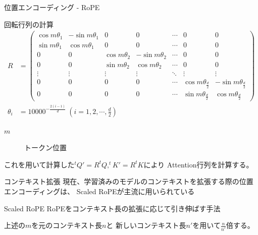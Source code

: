 \documentclass[dvipdfm]{beamer}
\begin{document}
    \begin{frame}{位置エンコーディング - RoPE}
        \begin{block}{回転行列の計算}
            {\small
                \begin{align*}
                    R &= \begin{pmatrix}
                        \cos m\theta_1 & -\sin m\theta_1 & 0 & 0 & \cdots & 0 & 0 \\
                        \sin m\theta_1 & \cos m\theta_1 & 0 & 0 & \cdots & 0 & 0 \\
                        0 & 0 & \cos m\theta_2 & -\sin m\theta_2 & \cdots & 0 & 0 \\
                        0 & 0 & \sin m\theta_2 & \cos m\theta_2 & \cdots & 0 & 0 \\
                        \vdots & \vdots & \vdots & \vdots & \ddots & \vdots & \vdots \\
                        0 & 0 & 0 & 0 & \cdots & \cos m\theta_\frac{d}{2} & -\sin m\theta_\frac{d}{2} \\
                        0 & 0 & 0 & 0 & \cdots & \sin m\theta_\frac{d}{2} & \cos m\theta_\frac{d}{2}
                    \end{pmatrix} \\
                    \theta_i &= 10000^{-\frac{2(i-1)}{d}} \ \left(i = 1, 2, \cdots, \frac{d}{2}\right)
                \end{align*}
            }

            \begin{description}
                \item[$m$] トークン位置
            \end{description}
        \end{block}
        これを用いて計算した$^t\!Q' = R^t\!Q, ^t\!K' = R^t\!K$により
        Attention行列を計算する。
    \end{frame}
    \begin{frame}{コンテキスト拡張}
        現在、学習済みのモデルのコンテキストを拡張する際の位置エンコーディングは、
        Scaled RoPEが主流に用いられている
        \begin{block}{Scaled RoPE}
            RoPEをコンテキスト長の拡張に応じて引き伸ばす手法

            上述の$m$を元のコンテキスト長$n$と
            新しいコンテキスト長$n'$を用いて$\displaystyle\frac{n}{n'}$倍する。
        \end{block}
    \end{frame}
\end{document}
